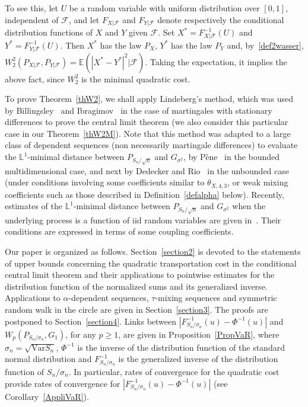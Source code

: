 \documentclass[10pt]{amsart}
\theoremstyle{definition}\newtheorem{defi}[theo]{Definition}\newtheorem{rema}[theo]{Remark}\newtheorem{exam}[theo]{Example}\newtheorem{exem}[theo]{Example}\newtheorem{nota}[theo]{Notation}
\newcommand{\bbE}{\mathbb{E}}
\newcommand{\clF}{\mathcal{F}}
\newcommand{\bbL}{\mathbb{L}}
\newcommand{\Var}{\mathrm{Var}}
\begin{document}
To see this, let $U$ be a random variable with uniform distribution over $[0,1]$, independent of $\clF$, and let $F_{ X| \clF }$ and $F_{ Y| \clF }$ denote respectively the conditional distribution functions of $X$ and $Y$ given $\clF$. Set $X^* = F_{ X| \clF }^{-1} (U)$ and $Y^* = F_{Y| \clF }^{-1} (U)$. Then $X^*$ has the law $P_X$, $Y^*$ has the law $P_Y$ and, by~\eqref{def2wasser}, $W_2^2 (P_{X | \clF}, P_{Y | \clF}) = \bbE (|X^* - Y^*|^2 | \clF)$. Taking the expectation, it implies the above fact, since $W_2^2$ is the minimal quadratic cost.



To prove Theorem~\ref{thW2}, we shall apply Lindeberg's method, which was used by Billingsley~\cite{Bil61} and Ibragimov~\cite{Ibr63} in the case of martingales with stationary differences to prove the central limit theorem (we also consider this particular case in our Theorem~\ref{thW2M}). Note that this method was adapted to a large class of dependent sequences (non necessarily martingale differences) to evaluate the $\bbL^1$-minimal distance between $P_{S_n / {\sqrt n}}$ and $G_{\sigma^2}$, by Pène~\cite{Pe05} in the bounded multidimensional case, and next by Dedecker and Rio~\cite{DR08} in the unbounded case (under conditions involving some coefficients similar to $\theta_{X,4,3}$, or weak mixing coefficients such as those described in Definition~\ref{defalpha} below). Recently, estimates of the $\bbL^1$-minimal distance between $P_{S_n / {\sqrt n}}$ and $G_{\sigma^2}$ when the underlying process is a function of iid random variables are given in~\cite[Theorem~3.1]{JWZ}. Their conditions are expressed in terms of some coupling coefficients.



Our paper is organized as follows. Section~\ref{section2} is devoted to the statements of upper bounds concerning the quadratic transportation cost in the conditional central limit theorem and their applications to pointwise estimates for the distribution function of the normalized sums and its generalized inverse. Applications to $\alpha$-dependent sequences, $\tau$-mixing sequences and symmetric random walk in the circle are given in Section~\ref{section3}. The proofs are postponed to Section~\ref{section4}. Links between $ | F_{S_n/\sigma_n}^{-1}(u) - \Phi^{-1} (u) | $ and $W_p (P_{S_n / \sigma_n}, G_1)$, for any $p \geq 1$, are given in Proposition~\ref{PropVaR}, where $\sigma_n = \sqrt{ \Var S_n}$, $\Phi^{-1}$ is the inverse of the distribution function of the standard normal distribution and $F_{S_n/\sigma_n}^{-1}$ is the generalized inverse of the distribution function of $S_n/\sigma_n$. In particular, rates of convergence for the quadratic cost provide rates of convergence for $ | F_{S_n/\sigma_n}^{-1}(u) - \Phi^{-1} (u) | $ (see Corollary~\ref{AppliVaR}).
\end{document}
